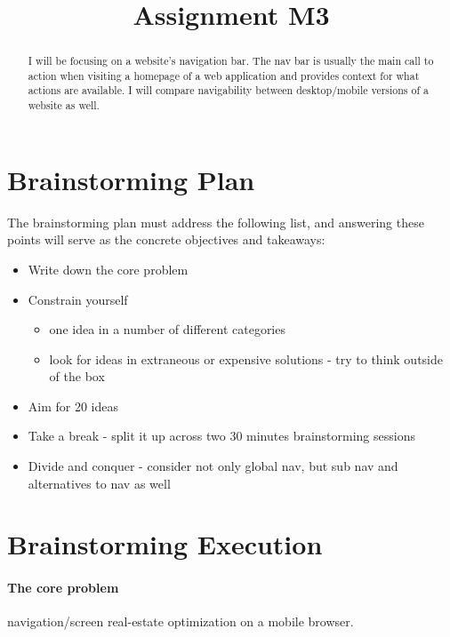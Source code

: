 

\title{Assignment M3\\}



\maketitle
\thispagestyle{fancy}

\begin{abstract}
I will be focusing on a website’s navigation bar. The nav bar is usually the main call to action when visiting a homepage of a web application and provides context for what actions are available. I will compare navigability between desktop/mobile versions of a website as well.
\end{abstract}


\section{Brainstorming Plan}
The brainstorming plan must address the following list, and answering these points will serve as the concrete objectives and takeaways:

\begin{itemize}
\item
  Write down the core problem
\item
  Constrain yourself
  \begin{itemize}
  \item
    one idea in a number of different categories
  \item
    look for ideas in extraneous or expensive solutions - try to think outside of the box
  \end{itemize}
\item
  Aim for 20 ideas
\item
  Take a break - split it up across two 30 minutes brainstorming sessions
\item
  Divide and conquer - consider not only global nav, but sub nav and alternatives to nav as well
\end{itemize}


\section{Brainstorming Execution}
\paragraph{The core problem} navigation/screen real-estate optimization on a mobile browser.

